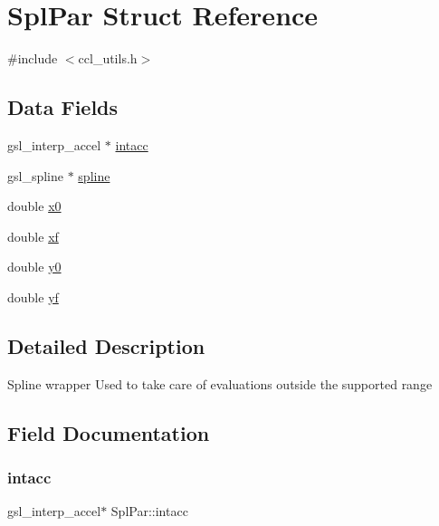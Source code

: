\hypertarget{struct_spl_par}{}\section{Spl\+Par Struct Reference}
\label{struct_spl_par}


{\ttfamily \#include $<$ccl\+\_\+utils.\+h$>$}

\subsection*{Data Fields}
\begin{DoxyCompactItemize}
\item 
gsl\+\_\+interp\+\_\+accel $\ast$ \mbox{\hyperlink{struct_spl_par_ac178fcf7387eab1998abd2653c47ab24}{intacc}}
\item 
gsl\+\_\+spline $\ast$ \mbox{\hyperlink{struct_spl_par_ae8f88172b1b5531e97049f3996734d61}{spline}}
\item 
double \mbox{\hyperlink{struct_spl_par_a13c74ee83d8d7f138bac671adaa7cf74}{x0}}
\item 
double \mbox{\hyperlink{struct_spl_par_a81d8596b683922ed144fd8766e01f3f3}{xf}}
\item 
double \mbox{\hyperlink{struct_spl_par_a49d3136602dec3eff0bfd5c631615cb0}{y0}}
\item 
double \mbox{\hyperlink{struct_spl_par_a3e483146b3649beeaa42e854f7b7a386}{yf}}
\end{DoxyCompactItemize}


\subsection{Detailed Description}
Spline wrapper Used to take care of evaluations outside the supported range 

\subsection{Field Documentation}
\mbox{\label{struct_spl_par_ac178fcf7387eab1998abd2653c47ab24}} 
\subsubsection{\texorpdfstring{intacc}{intacc}}
{\footnotesize\ttfamily gsl\+\_\+interp\+\_\+accel$\ast$ Spl\+Par\+::intacc}

